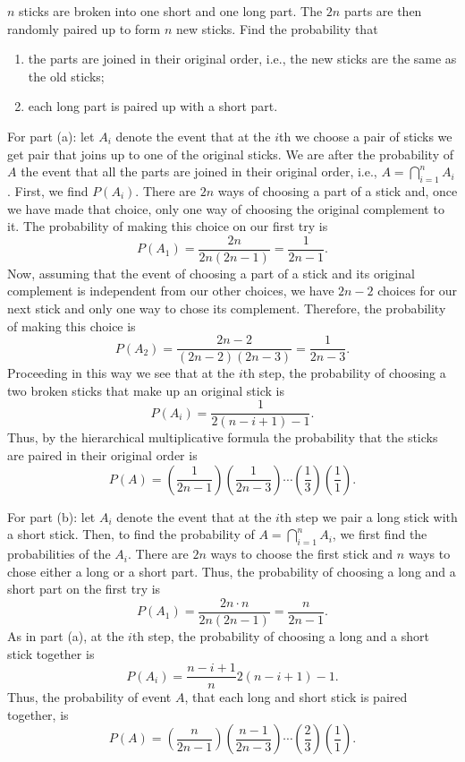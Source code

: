 \begin{problem}[Handout 3, \# 3]
  \(n\) sticks are broken into one short and one long part. The \(2n\)
  parts are then randomly paired up to form \(n\) new sticks. Find the
  probability that
  \begin{enumerate}[label=(\alph*),noitemsep]
  \item the parts are joined in their original order, i.e., the new sticks
    are the same as the old sticks;
  \item each long part is paired up with a short part.
  \end{enumerate}
\end{problem}
\begin{solution}
  For part (a): let \(A_i\) denote the event that at the \(i\)th we choose
  a pair of sticks we get pair that joins up to one of the original
  sticks. We are after the probability of \(A\) the event that all the
  parts are joined in their original order, i.e.,
  \(A=\bigcap_{i=1}^n A_i\). First, we find \(P(A_i)\). There are \(2n\)
  ways of choosing a part of a stick and, once we have made that choice,
  only one way of choosing the original complement to it. The probability
  of making this choice on our first try is
  \[
    P(A_1)=\frac{2n}{2n(2n-1)}=\frac{1}{2n-1}.
  \]
  Now, assuming that the event of choosing a part of a stick and its
  original complement is independent from our other choices, we have
  \(2n-2\) choices for our next stick and only one way to chose its
  complement. Therefore, the probability of making this choice is
  \[
    P(A_2)=\frac{2n-2}{(2n-2)(2n-3)}=\frac{1}{2n-3}.
  \]
  Proceeding in this way we see that at the \(i\)th step, the probability
  of choosing a two broken sticks that make up an original stick is
  \[
    P(A_i)=\frac{1}{2(n-i+1)-1}.
  \]
  Thus, by the hierarchical multiplicative formula the probability that the
  sticks are paired in their original order is
  \[
    P(A)=\left(\frac{1}{2n-1}\right)\left(\frac{1}{2n-3}\right) \dotsm
    \left(\frac{1}{3}\right)\left(\frac{1}{1}\right).
  \]

  For part (b): let \(A_i\) denote the event that at the \(i\)th step we
  pair a long stick with a short stick. Then, to find the probability of
  \(A=\bigcap_{i=1}^n A_i\), we first find the probabilities of the
  \(A_i\). There are \(2n\) ways to choose the first stick and \(n\) ways
  to chose either a long or a short part. Thus, the probability of choosing
  a long and a short part on the first try is
  \[
    P(A_1)=\frac{2n\cdot n}{2n(2n-1)}=\frac{n}{2n-1}.
  \]
  As in part (a), at the \(i\)th step, the probability of choosing a long
  and a short stick together is
  \[
    P(A_i)=\frac{n-i+1}n{2(n-i+1)-1}.
  \]
  Thus, the probability of event \(A\), that each long and short stick is
  paired together, is
  \[
    P(A)=\left(\frac{n}{2n-1}\right)\left(\frac{n-1}{2n-3}\right)\dotsm
    \left(\frac{2}{3}\right)\left(\frac{1}{1}\right).
  \]
\end{solution}
\newpage

